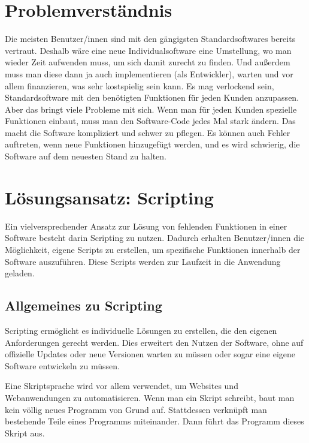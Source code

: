 \section{Problemverständnis}

Die meisten Benutzer/innen sind mit den gängigsten Standardsoftwares bereits vertraut. 
Deshalb wäre eine neue Individualsoftware eine Umstellung, wo man wieder Zeit aufwenden muss, 
um sich damit zurecht zu finden. Und außerdem muss man diese dann ja auch implementieren (als Entwickler), 
warten und vor allem finanzieren, was sehr kostspielig sein kann. 
\newline
Es mag verlockend sein, Standardsoftware mit den benötigten Funktionen für jeden Kunden anzupassen. 
Aber das bringt viele Probleme mit sich. Wenn man für jeden Kunden 
spezielle Funktionen einbaut, muss man den Software-Code jedes Mal stark ändern. 
Das macht die Software kompliziert und schwer zu pflegen. Es können auch Fehler auftreten, 
wenn neue Funktionen hinzugefügt werden, und es wird schwierig, die Software auf dem 
neuesten Stand zu halten.

\newpage
\section{Lösungsansatz: Scripting}

Ein vielversprechender Ansatz zur Lösung von fehlenden Funktionen in einer Software besteht darin 
Scripting zu nutzen. Dadurch erhalten Benutzer/innen die Möglichkeit, eigene Scripts zu erstellen, 
um spezifische Funktionen innerhalb der Software auszuführen. Diese Scripts werden 
zur Laufzeit in die Anwendung geladen.

\subsection*{Allgemeines zu Scripting}

Scripting ermöglicht es individuelle Lösungen zu erstellen, 
die den eigenen Anforderungen gerecht werden. 
Dies erweitert den Nutzen der Software, ohne auf offizielle Updates oder neue Versionen 
warten zu müssen oder sogar eine eigene Software entwickeln zu müssen.

Eine Skriptsprache wird vor allem verwendet, um Websites und Webanwendungen zu automatisieren. 
Wenn man ein Skript schreibt, baut man kein völlig neues Programm von Grund auf. 
Stattdessen verknüpft man bestehende Teile eines Programms miteinander. 
Dann führt das Programm dieses Skript aus.

